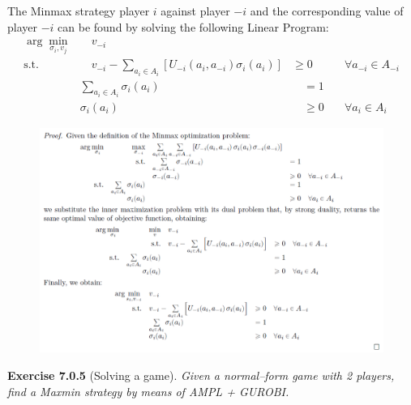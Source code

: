 \noindent
The Minmax strategy player $i$ against player $-i$ and the corresponding value of player $-i$ can be found by solving the following Linear Program:
\begin{align*}
\arg \min_{\sigma_{i}, v_j} & \quad v_{-i}\\
\text{s.t.} & \quad v_{-i}-\sum_{a_{i} \in A_{i}}\left[U_{-i}\left(a_{i}, a_{-i}\right) \sigma_{i}\left(a_{i}\right)\right] & \geqslant 0 & \quad \forall a_{-i} \in A_{-i} \\
& \sum_{a_{i} \in A_{i}} \sigma_{i}\left(a_{i}\right) & \quad =1 &\\
& \sigma_{i}\left(a_{i}\right) & \quad \geqslant  0 & \quad \forall a_{i} \in A_{i}
\end{align*}
\begin{figure}[H]
\centering
\includegraphics[width=\textwidth]{images/img_2_7_04.png}
\end{figure}
\textbf{Exercise 7.0.5} (Solving a game). \textit{Given a normal–form game with 2 players, find a Maxmin strategy by means of AMPL + GUROBI.}\\
